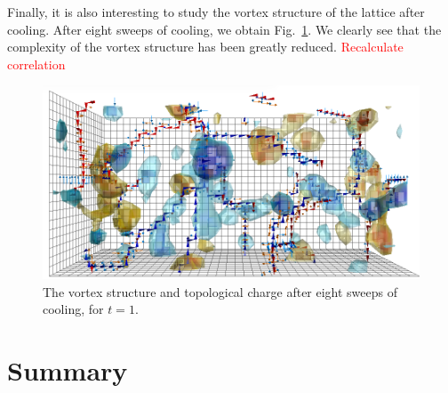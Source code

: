 Finally, it is also interesting to study the vortex structure of the lattice after cooling. After eight sweeps of cooling, we obtain Fig.~\ref{fig:PlaqLinkTopQ_SW8}. We clearly see that the complexity of the vortex structure has been greatly reduced. \textcolor{red}{Recalculate correlation}
%
\begin{figure}
\centering
\includegraphics[width=\linewidth]{./PlaqLinkTopQ_CFG95_T01_8SW.png}
\caption{\label{fig:PlaqLinkTopQ_SW8}The vortex structure and topological charge after eight sweeps of cooling, for $t=1$.}
\end{figure}
\section{Summary}
